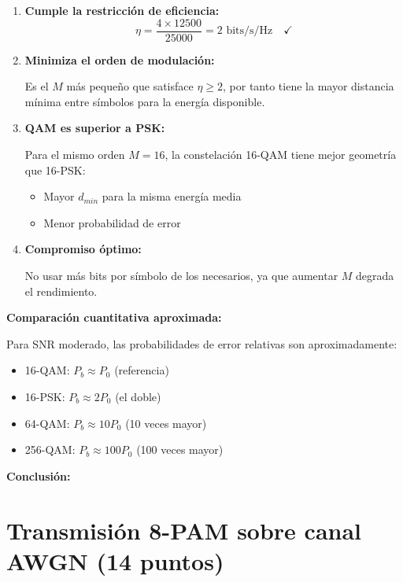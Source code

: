 \documentclass[11pt,a4paper]{article}
\begin{document}
\begin{enumerate}
    \item \textbf{Cumple la restricci\'on de eficiencia:}
    \[
    \eta = \frac{4 \times 12500}{25000} = 2 \text{ bits/s/Hz} \quad ✓
    \]
    
    \item \textbf{Minimiza el orden de modulaci\'on:}
    
    Es el $M$ m\'as peque\~no que satisface $\eta \geq 2$, por tanto tiene la mayor distancia m\'inima entre s\'imbolos para la energ\'ia disponible.
    
    \item \textbf{QAM es superior a PSK:}
    
    Para el mismo orden $M = 16$, la constelaci\'on 16-QAM tiene mejor geometr\'ia que 16-PSK:
    \begin{itemize}
        \item Mayor $d_{min}$ para la misma energ\'ia media
        \item Menor probabilidad de error
    \end{itemize}
    
    \item \textbf{Compromiso \'optimo:}
    
    No usar m\'as bits por s\'imbolo de los necesarios, ya que aumentar $M$ degrada el rendimiento.
\end{enumerate}

\textbf{Comparaci\'on cuantitativa aproximada:}

Para SNR moderado, las probabilidades de error relativas son aproximadamente:
\begin{itemize}
    \item 16-QAM: $P_b \approx P_0$ (referencia)
    \item 16-PSK: $P_b \approx 2 P_0$ (el doble)
    \item 64-QAM: $P_b \approx 10 P_0$ (10 veces mayor)
    \item 256-QAM: $P_b \approx 100 P_0$ (100 veces mayor)
\end{itemize}

\textbf{Conclusi\'on:} 



\newpage
\section*{Transmisi\'on 8-PAM sobre canal AWGN (14 puntos)}
\end{document}
